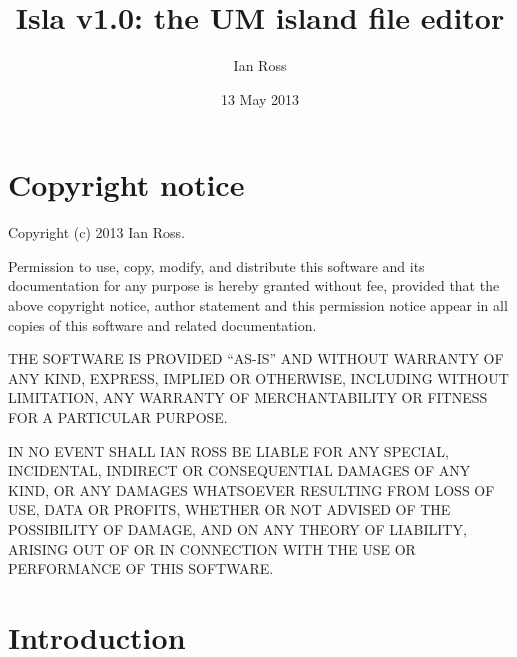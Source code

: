\documentclass[11pt,makeidx,texhelp]{report}
\title{Isla v1.0: the UM island file editor}
\author{Ian Ross}
\date{13 May 2013}
\begin{document}
\maketitle

\tableofcontents

\chapter*{Copyright notice}

Copyright (c) 2013 Ian Ross.

Permission to use, copy, modify, and distribute this software and its
documentation for any purpose is hereby granted without fee, provided that the
above copyright notice, author statement and this permission notice appear in
all copies of this software and related documentation.

THE SOFTWARE IS PROVIDED ``AS-IS'' AND WITHOUT WARRANTY OF ANY KIND, EXPRESS,
IMPLIED OR OTHERWISE, INCLUDING WITHOUT LIMITATION, ANY WARRANTY OF
MERCHANTABILITY OR FITNESS FOR A PARTICULAR PURPOSE.

IN NO EVENT SHALL IAN ROSS BE LIABLE FOR ANY SPECIAL, INCIDENTAL,
INDIRECT OR CONSEQUENTIAL DAMAGES OF ANY KIND, OR ANY DAMAGES
WHATSOEVER RESULTING FROM LOSS OF USE, DATA OR PROFITS, WHETHER OR NOT
ADVISED OF THE POSSIBILITY OF DAMAGE, AND ON ANY THEORY OF LIABILITY,
ARISING OUT OF OR IN CONNECTION WITH THE USE OR PERFORMANCE OF THIS
SOFTWARE.

\chapter{Introduction}
\end{document}
